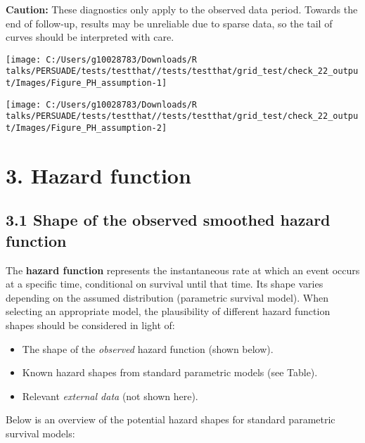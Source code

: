 \documentclass[
]{article}
\providecommand{\tightlist}{%
  \setlength{\itemsep}{0pt}\setlength{\parskip}{0pt}}
\begin{document}
\textbf{Caution:} These diagnostics only apply to the observed data
period. Towards the end of follow-up, results may be unreliable due to
sparse data, so the tail of curves should be interpreted with care.

\clearpage

\begin{flushleft}\texttt{[image: C:/Users/g10028783/Downloads/R talks/PERSUADE/tests/testthat//tests/testthat/grid\_test/check\_22\_output/Images/Figure\_PH\_assumption-1]} \end{flushleft}

\begin{flushleft}\texttt{[image: C:/Users/g10028783/Downloads/R talks/PERSUADE/tests/testthat//tests/testthat/grid\_test/check\_22\_output/Images/Figure\_PH\_assumption-2]} \end{flushleft}

\clearpage

\section{3. Hazard function}\label{hazard-function}

\subsection{3.1 Shape of the observed smoothed hazard
function}\label{shape-of-the-observed-smoothed-hazard-function}

The \textbf{hazard function} represents the instantaneous rate at which
an event occurs at a specific time, conditional on survival until that
time. Its shape varies depending on the assumed distribution (parametric
survival model). When selecting an appropriate model, the plausibility
of different hazard function shapes should be considered in light of:

\begin{itemize}
\tightlist
\item
  The shape of the \emph{observed} hazard function (shown below).
\item
  Known hazard shapes from standard parametric models (see Table).
\item
  Relevant \emph{external data} (not shown here).
\end{itemize}

Below is an overview of the potential hazard shapes for standard
parametric survival models:
\end{document}
